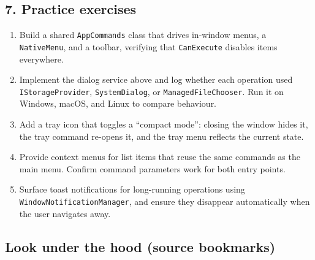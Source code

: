 \subsection{7. Practice exercises}\label{practice-exercises-7}

\begin{enumerate}
\def\labelenumi{\arabic{enumi}.}
\tightlist
\item
  Build a shared \passthrough{\lstinline!AppCommands!} class that drives
  in-window menus, a \passthrough{\lstinline!NativeMenu!}, and a
  toolbar, verifying that \passthrough{\lstinline!CanExecute!} disables
  items everywhere.
\item
  Implement the dialog service above and log whether each operation used
  \passthrough{\lstinline!IStorageProvider!},
  \passthrough{\lstinline!SystemDialog!}, or
  \passthrough{\lstinline!ManagedFileChooser!}. Run it on Windows,
  macOS, and Linux to compare behaviour.
\item
  Add a tray icon that toggles a ``compact mode'': closing the window
  hides it, the tray command re-opens it, and the tray menu reflects the
  current state.
\item
  Provide context menus for list items that reuse the same commands as
  the main menu. Confirm command parameters work for both entry points.
\item
  Surface toast notifications for long-running operations using
  \passthrough{\lstinline!WindowNotificationManager!}, and ensure they
  disappear automatically when the user navigates away.
\end{enumerate}

\subsection{Look under the hood (source
bookmarks)}\label{look-under-the-hood-source-bookmarks-11}

